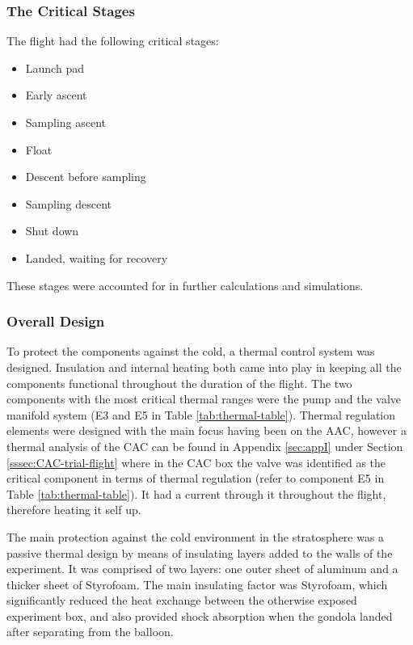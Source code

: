 \subsubsection{The Critical Stages}
The flight had the following critical stages:
\begin{itemize}
    \item Launch pad
    \item Early ascent
    \item Sampling ascent
    \item Float
    \item Descent before sampling
    \item Sampling descent
    \item Shut down
    \item Landed, waiting for recovery
\end{itemize}
These stages were accounted for in further calculations and simulations.

\subsubsection{Overall Design}
To protect the components against the cold, a thermal control system was designed. Insulation and internal heating both came into play in keeping all the components functional throughout the duration of the flight. The two components with the most critical thermal ranges were the pump and the valve manifold system (E3 and E5 in Table \ref{tab:thermal-table}). Thermal regulation elements were designed with the main focus having been on the AAC, however a thermal analysis of the CAC can be found in Appendix \ref{sec:appI} under Section \ref{sssec:CAC-trial-flight} where in the CAC box the valve was identified as the critical component in terms of thermal regulation (refer to component E5 in Table \ref{tab:thermal-table}). It had a current through it throughout the flight, therefore heating it self up.

The main protection against the cold environment in the stratosphere was a passive thermal design by means of insulating layers added to the walls of the experiment. It was comprised of two layers: one outer sheet of aluminum and a thicker sheet of Styrofoam. The main insulating factor was Styrofoam, which significantly reduced the heat exchange between the otherwise exposed experiment box, and also provided shock absorption when the gondola landed after separating from the balloon.

